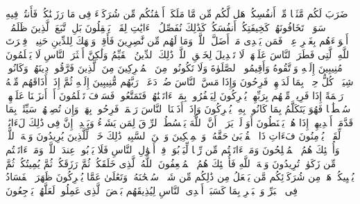 \stopbuffer%
\startbuffer[\q:30:28]
ضَرَبَ لَكُم مَّثَلࣰا مِّنۡ أَنفُسِكُمۡۖ هَل لَّكُم مِّن مَّا مَلَكَتۡ أَیۡمَٰنُكُم مِّن شُرَكَاۤءَ فِی مَا رَزَقۡنَٰكُمۡ فَأَنتُمۡ فِیهِ سَوَاۤءࣱ تَخَافُونَهُمۡ كَخِیفَتِكُمۡ أَنفُسَكُمۡۚ كَذَٰلِكَ نُفَصِّلُ ٱلۡءَایَٰتِ لِقَوۡمࣲ یَعۡقِلُونَ%
\stopbuffer%
\startbuffer[\q:30:29]
بَلِ ٱتَّبَعَ ٱلَّذِینَ ظَلَمُوۤا۟ أَهۡوَاۤءَهُم بِغَیۡرِ عِلۡمࣲۖ فَمَن یَهۡدِی مَنۡ أَضَلَّ ٱللَّهُۖ وَمَا لَهُم مِّن نَّٰصِرِینَ%
\stopbuffer%
\startbuffer[\q:30:30]
فَأَقِمۡ وَجۡهَكَ لِلدِّینِ حَنِیفࣰاۚ فِطۡرَتَ ٱللَّهِ ٱلَّتِی فَطَرَ ٱلنَّاسَ عَلَیۡهَاۚ لَا تَبۡدِیلَ لِخَلۡقِ ٱللَّهِۚ ذَٰلِكَ ٱلدِّینُ ٱلۡقَیِّمُ وَلَٰكِنَّ أَكۡثَرَ ٱلنَّاسِ لَا یَعۡلَمُونَ%
\stopbuffer%
\startbuffer[\q:30:31]
۞ مُنِیبِینَ إِلَیۡهِ وَٱتَّقُوهُ وَأَقِیمُوا۟ ٱلصَّلَوٰةَ وَلَا تَكُونُوا۟ مِنَ ٱلۡمُشۡرِكِینَ%
\stopbuffer%
\startbuffer[\q:30:32]
مِنَ ٱلَّذِینَ فَرَّقُوا۟ دِینَهُمۡ وَكَانُوا۟ شِیَعࣰاۖ كُلُّ حِزۡبِۭ بِمَا لَدَیۡهِمۡ فَرِحُونَ%
\stopbuffer%
\startbuffer[\q:30:33]
وَإِذَا مَسَّ ٱلنَّاسَ ضُرࣱّ دَعَوۡا۟ رَبَّهُم مُّنِیبِینَ إِلَیۡهِ ثُمَّ إِذَاۤ أَذَاقَهُم مِّنۡهُ رَحۡمَةً إِذَا فَرِیقࣱ مِّنۡهُم بِرَبِّهِمۡ یُشۡرِكُونَ%
\stopbuffer%
\startbuffer[\q:30:34]
لِیَكۡفُرُوا۟ بِمَاۤ ءَاتَیۡنَٰهُمۡۚ فَتَمَتَّعُوا۟ فَسَوۡفَ تَعۡلَمُونَ%
\stopbuffer%
\startbuffer[\q:30:35]
أَمۡ أَنزَلۡنَا عَلَیۡهِمۡ سُلۡطَٰنࣰا فَهُوَ یَتَكَلَّمُ بِمَا كَانُوا۟ بِهِۦ یُشۡرِكُونَ%
\stopbuffer%
\startbuffer[\q:30:36]
وَإِذَاۤ أَذَقۡنَا ٱلنَّاسَ رَحۡمَةࣰ فَرِحُوا۟ بِهَاۖ وَإِن تُصِبۡهُمۡ سَیِّئَةُۢ بِمَا قَدَّمَتۡ أَیۡدِیهِمۡ إِذَا هُمۡ یَقۡنَطُونَ%
\stopbuffer%
\startbuffer[\q:30:37]
أَوَ لَمۡ یَرَوۡا۟ أَنَّ ٱللَّهَ یَبۡسُطُ ٱلرِّزۡقَ لِمَن یَشَاۤءُ وَیَقۡدِرُۚ إِنَّ فِی ذَٰلِكَ لَءَایَٰتࣲ لِّقَوۡمࣲ یُؤۡمِنُونَ%
\stopbuffer%
\startbuffer[\q:30:38]
فَءَاتِ ذَا ٱلۡقُرۡبَىٰ حَقَّهُۥ وَٱلۡمِسۡكِینَ وَٱبۡنَ ٱلسَّبِیلِۚ ذَٰلِكَ خَیۡرࣱ لِّلَّذِینَ یُرِیدُونَ وَجۡهَ ٱللَّهِۖ وَأُو۟لَٰۤئِكَ هُمُ ٱلۡمُفۡلِحُونَ%
\stopbuffer%
\startbuffer[\q:30:39]
وَمَاۤ ءَاتَیۡتُم مِّن رِّبࣰا لِّیَرۡبُوَا۟ فِیۤ أَمۡوَٰلِ ٱلنَّاسِ فَلَا یَرۡبُوا۟ عِندَ ٱللَّهِۖ وَمَاۤ ءَاتَیۡتُم مِّن زَكَوٰةࣲ تُرِیدُونَ وَجۡهَ ٱللَّهِ فَأُو۟لَٰۤئِكَ هُمُ ٱلۡمُضۡعِفُونَ%
\stopbuffer%
\startbuffer[\q:30:40]
ٱللَّهُ ٱلَّذِی خَلَقَكُمۡ ثُمَّ رَزَقَكُمۡ ثُمَّ یُمِیتُكُمۡ ثُمَّ یُحۡیِیكُمۡۖ هَلۡ مِن شُرَكَاۤئِكُم مَّن یَفۡعَلُ مِن ذَٰلِكُم مِّن شَیۡءࣲۚ سُبۡحَٰنَهُۥ وَتَعَٰلَىٰ عَمَّا یُشۡرِكُونَ%
\stopbuffer%
\startbuffer[\q:30:41]
ظَهَرَ ٱلۡفَسَادُ فِی ٱلۡبَرِّ وَٱلۡبَحۡرِ بِمَا كَسَبَتۡ أَیۡدِی ٱلنَّاسِ لِیُذِیقَهُم بَعۡضَ ٱلَّذِی عَمِلُوا۟ لَعَلَّهُمۡ یَرۡجِعُونَ%
\stopbuffer%
